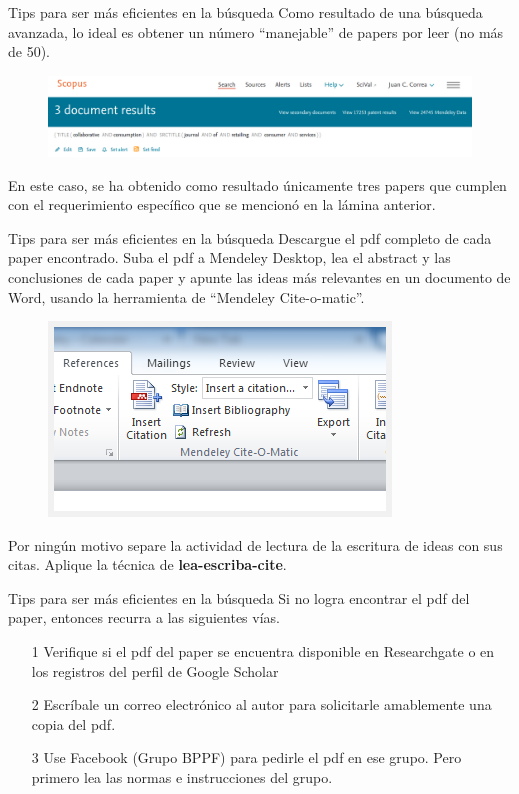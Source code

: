 \documentclass[9pt]{beamer}
\begin{document}
\begin{frame}{Tips para ser más eficientes en la búsqueda}
Como resultado de una búsqueda avanzada, lo ideal es obtener un número ``manejable'' de papers por leer (no más de 50).
\begin{figure}
\centering
 \includegraphics[width=1\textwidth]{b14}
\end{figure}
En este caso, se ha obtenido como resultado únicamente tres papers que cumplen con el requerimiento específico que se mencionó en la lámina anterior.
\end{frame}

\begin{frame}{Tips para ser más eficientes en la búsqueda}
Descargue el pdf completo de cada paper encontrado. Suba el pdf a Mendeley Desktop, lea el abstract y las conclusiones de cada paper y apunte las ideas más relevantes en un documento de Word, usando la herramienta de ``Mendeley Cite-o-matic''.
\begin{figure}
\centering
 \includegraphics[width=.5\textwidth]{b15}
\end{figure}
Por ningún motivo separe la actividad de lectura de la escritura de ideas con sus citas. Aplique la técnica de \textbf{lea-escriba-cite}.
\end{frame}

\begin{frame}{Tips para ser más eficientes en la búsqueda}
Si no logra encontrar el pdf del paper, entonces recurra a las siguientes vías.
\begin{itemize}
    \item[1] Verifique si el pdf del paper se encuentra disponible en Researchgate o en los registros del perfil de Google Scholar
    \item[2] Escríbale un correo electrónico al autor para solicitarle amablemente una copia del pdf.
    \item[3] Use Facebook (Grupo BPPF) para pedirle el pdf en ese grupo. Pero primero lea las normas e instrucciones del grupo.
\end{itemize}
\end{frame}
\end{document}
